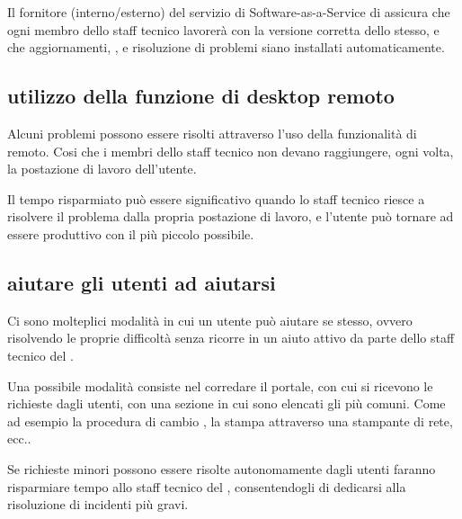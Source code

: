 Il fornitore (interno/esterno) del servizio di \ac{Software-as-a-Service} di  assicura che ogni membro dello staff tecnico lavorerà con la versione corretta dello stesso, e che aggiornamenti, , e risoluzione di problemi siano installati automaticamente.

\subsection[Utilizzo della funzione di desktop remoto]{utilizzo della funzione di desktop remoto}
Alcuni problemi possono essere risolti attraverso l'uso della funzionalità di  remoto. Cosi che i membri dello staff tecnico non devano raggiungere, ogni volta, la postazione di lavoro dell'utente.

Il tempo risparmiato può essere significativo quando lo staff tecnico riesce a risolvere il problema dalla propria postazione di lavoro, e l'utente può tornare ad essere produttivo con il più piccolo  possibile.

\subsection[Aiutare gli utenti ad aiutarsi]{aiutare gli utenti ad aiutarsi}
Ci sono molteplici modalità in cui un utente può aiutare se stesso, ovvero risolvendo le proprie difficoltà senza ricorre in un aiuto attivo da parte dello staff tecnico del .

Una possibile modalità consiste nel corredare il portale, con cui si ricevono le richieste dagli utenti, con una sezione in cui sono elencati gli  più comuni. Come ad esempio la procedura di cambio , la stampa attraverso una stampante di rete, ecc..

Se richieste minori possono essere risolte autonomamente dagli utenti faranno risparmiare tempo allo staff tecnico del , consentendogli di dedicarsi alla risoluzione di incidenti più gravi.